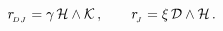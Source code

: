 \begin{equation}\label{boro1.9}
r_{\!_{DJ}}=\gamma\,{\cal H}\wedge{\cal K}\,,\qquad
r_{\!_{J}}=\xi\,{\cal D}\wedge{\cal H}\,.
\end{equation}

